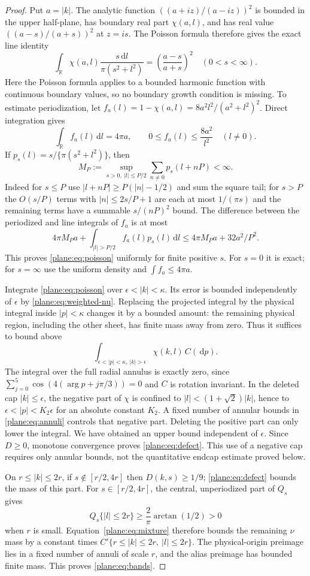 \documentclass[11pt]{article}
\theoremstyle{definition}
\theoremstyle{remark}
\numberwithin{equation}{section}
\begin{document}
\begin{proof}
Put $a=|k|$.  The analytic function
$((a+iz)/(a-iz))^2$ is bounded in the upper half-plane, has boundary
real part $\chi(a,l)$, and has real value $((a-s)/(a+s))^2$ at $z=is$.
The Poisson formula therefore gives the exact line identity
\begin{equation}
 \label{plane:eq:line-poisson}
 \int_\mathbb R\chi(a,l)\frac{s\,\mathrm d l}{\pi(s^2+l^2)}
     =\left(\frac{a-s}{a+s}\right)^2\quad(0<s<\infty).
\end{equation}
Here the Poisson formula applies to a bounded harmonic function with
continuous boundary values, so no boundary growth condition is missing.
To estimate periodization, let
$f_a(l)=1-\chi(a,l)=8a^2l^2/(a^2+l^2)^2$.  Direct integration gives
\[
 \int_\mathbb R f_a(l)\,\mathrm d l=4\pi a,
 \qquad 0\le f_a(l)\le\frac{8a^2}{l^2}\quad(l\ne0).
\]
If $p_s(l)=s/\{\pi(s^2+l^2)\}$, then
\[
 M_P:=\sup_{s>0,\ |l|\le P/2}\sum_{n\ne0}p_s(l+nP)<\infty.
\]
Indeed for $s\le P$ use $|l+nP|\ge P(|n|-1/2)$ and sum the
square tail; for $s>P$ the $O(s/P)$ terms with $|n|\le2s/P+1$
are each at most $1/(\pi s)$ and the remaining terms have a summable
$s/(nP)^2$ bound.  The difference between the periodized and line
integrals of $f_a$ is at most
\[
 4\pi M_Pa+
 \int_{|l|>P/2}f_a(l)p_s(l)\,\mathrm d l
 \le4\pi M_Pa+32a^2/P^2.
\]
This proves \eqref{plane:eq:poisson} uniformly for finite positive $s$.
For $s=0$ it is exact; for $s=\infty$ use the uniform density and
$\int f_a\le4\pi a$.

Integrate \eqref{plane:eq:poisson} over
$\epsilon<|k|<\kappa$.  Its error is bounded independently of
$\epsilon$ by \eqref{plane:eq:weighted-nu}.
Replacing the projected integral by the physical integral inside
$|p|<\kappa$ changes it by a bounded amount: the remaining physical
region, including the other sheet, has finite mass away from zero.
Thus it suffices to bound above
\[
 \int_{\epsilon<|p|<\kappa,\ |k|>\epsilon}
                \chi(k,l)\,C(\,\mathrm d p).
\]
The integral over the full radial annulus is exactly zero, since
$\sum_{j=0}^5\cos(4(\arg p+j\pi/3))=0$ and $C$ is rotation invariant.
In the deleted cap $|k|\le\epsilon$, the negative part of $\chi$ is
confined to $|l|<(1+\sqrt2)|k|$, hence to
$\epsilon<|p|<K_2\epsilon$ for an absolute constant $K_2$.
A fixed number of annular bounds in \eqref{plane:eq:annuli} controls
that negative part.  Deleting the positive part can only lower the
integral.  We have obtained an upper bound independent of $\epsilon$.
Since $D\ge0$, monotone convergence proves \eqref{plane:eq:defect}.
This use of a negative cap requires only annular bounds, not the
quantitative endcap estimate proved below.

On $r\le|k|\le2r$, if $s\notin[r/2,4r]$ then $D(k,s)\ge1/9$;
\eqref{plane:eq:defect} bounds the mass of this part.
For $s\in[r/2,4r]$, the central, unperiodized part of $Q_s$ gives
\[
 Q_s\{|l|\le2r\}\ge\frac2\pi\arctan(1/2)>0
\]
when $r$ is small.  Equation~\eqref{plane:eq:mixture} therefore bounds
the remaining $\nu$ mass by a constant times
$C'\{r\le|k|\le2r,\ |l|\le2r\}$.  The physical-origin preimage
lies in a fixed number of annuli of scale $r$, and the alias preimage
has bounded finite mass.  This proves \eqref{plane:eq:bands}.
\end{proof}
\end{document}
